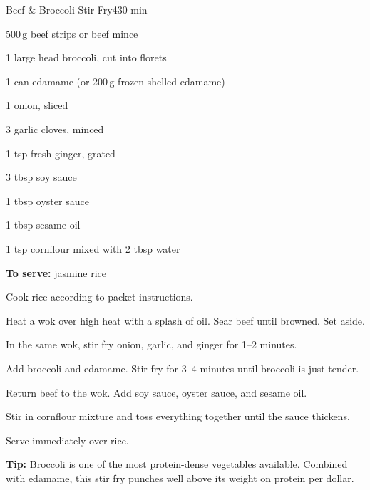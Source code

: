 \begin{recipebox}{Beef \& Broccoli Stir-Fry}{4}{30 min}
\begin{ingredients}
  \item 500\,g beef strips or beef mince
  \item 1 large head broccoli, cut into florets
  \item 1 can edamame (or 200\,g frozen shelled edamame)
  \item 1 onion, sliced
  \item 3 garlic cloves, minced
  \item 1 tsp fresh ginger, grated
  \item 3 tbsp soy sauce
  \item 1 tbsp oyster sauce
  \item 1 tbsp sesame oil
  \item 1 tsp cornflour mixed with 2 tbsp water
  \item \textbf{To serve:} jasmine rice
\end{ingredients}

\begin{method}
  \item Cook rice according to packet instructions.
  \item Heat a wok over high heat with a splash of oil. Sear beef until browned. Set aside.
  \item In the same wok, stir fry onion, garlic, and ginger for 1--2 minutes.
  \item Add broccoli and edamame. Stir fry for 3--4 minutes until broccoli is just tender.
  \item Return beef to the wok. Add soy sauce, oyster sauce, and sesame oil.
  \item Stir in cornflour mixture and toss everything together until the sauce thickens.
  \item Serve immediately over rice.
\end{method}

\begin{notelist}
  \item \textbf{Tip:} Broccoli is one of the most protein-dense vegetables available. Combined with edamame, this stir fry punches well above its weight on protein per dollar.
\end{notelist}
\end{recipebox}
